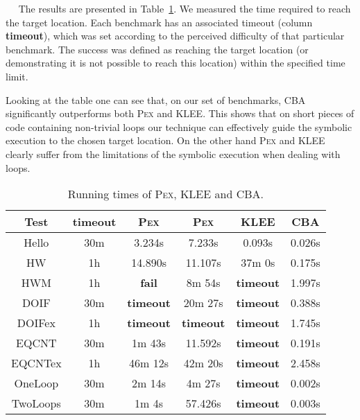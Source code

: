 \documentclass{llncs}
\newcommand{\Pex}{\textsc{Pex}\xspace}
\newcommand{\Klee}{\textsc{KLEE}\xspace}
\newcommand{\CBATool}{\textsc{CBA}\xspace}
\newcommand{\tout}{\textbf{timeout}}
\renewcommand{\paragraph}[1]{\vspace{0.2cm}\noindent{\bf #1}~~}
\begin{document}
\paragraph{Comparison results}
The results are presented in Table~\ref{TabExprRes}. We measured the time
required to reach the target location. Each benchmark has an associated
timeout (column \tout), which was set according to the perceived difficulty of that
particular benchmark. The success was defined as reaching the target
location (or demonstrating it is not possible to reach this location) within
the specified time limit.

Looking at the table one can see that, on our set of benchmarks, \CBATool
significantly outperforms both \Pex and \Klee. This shows that on short
pieces of code containing non-trivial loops our technique can effectively
guide the symbolic execution to the chosen target location. On the other
hand \Pex and \Klee clearly suffer from the limitations of the symbolic
execution when dealing with loops.

\begin{table}[!htb]
\vspace{-.3cm}
\centering
    \begin{tabular}{||*{6}{c|}|}
      \hline

      \bf Test  &
      \tout &
      \Pex &
      \Pex &
      \Klee &
      \CBATool \\
      \hline
      \hline
      Hello    & 30m & 3.234s  & 7.233s  & 0.093s           & 0.026s \\
      HW       & 1h  & 14.890s & 11.107s & 37m 0s           & 0.175s \\
      HWM      & 1h  & \textbf{fail}     & 8m 54s           & \tout & 1.997s \\
      DOIF      & 30m & \tout  & 20m 27s          & \tout & 0.388s \\
      DOIFex       & 1h  & \tout  & \tout & \tout & 1.745s \\
      EQCNT    & 30m & 1m 43s  & 11.592s & \tout & 0.191s \\
      \hline
      EQCNTex  & 1h  & 46m 12s & 42m 20s & \tout & 2.458s \\
      OneLoop  & 30m & 2m 14s  & 4m 27s  & \tout & 0.002s \\
      TwoLoops & 30m & 1m 4s   & 57.426s & \tout & 0.003s \\
      \hline
    \end{tabular}

\medskip
  \caption{Running times of \Pex, \Klee and \CBATool.}
\label{TabExprRes}
\vspace{-1.2cm}
\end{table}
\end{document}
